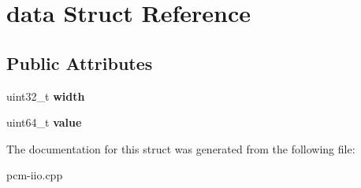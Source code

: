 \section{data Struct Reference}
\label{structdata}
\subsection*{Public Attributes}
\begin{DoxyCompactItemize}
\item 
\mbox{\label{structdata_a751af8cd5c196a997cf47c8e3c95802c}} 
uint32\+\_\+t {\bfseries width}
\item 
\mbox{\label{structdata_aee26865f2660705b3461088f8946f54c}} 
uint64\+\_\+t {\bfseries value}
\end{DoxyCompactItemize}


The documentation for this struct was generated from the following file\+:\begin{DoxyCompactItemize}
\item 
pcm-\/iio.\+cpp\end{DoxyCompactItemize}
